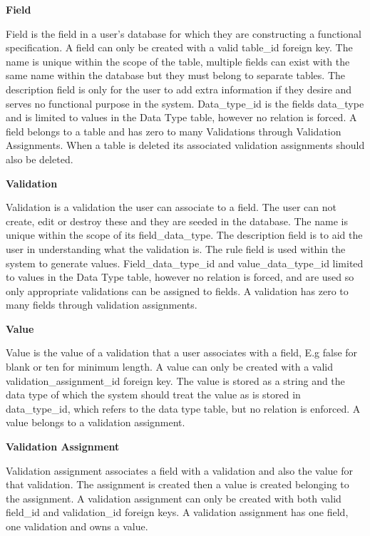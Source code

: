 \documentclass[a4paper,12pt]{article}
\begin{document}
\vspace{3mm}
\par \textbf{Field}
\par Field is the field in a user's database for which they are constructing a functional specification. A field can only be created with a valid table\_id foreign key. The name is unique within the scope of the table, multiple fields can exist with the same name within the database but they must belong to separate tables. The description field is only for the user to add extra information if they desire and serves no functional purpose in the system. Data\_type\_id is the fields data\_type and is limited to values in the Data Type table, however no relation is forced. A field belongs to a table and has zero to many Validations through Validation Assignments. When a table is deleted its associated validation assignments should also be deleted.
\vspace{3mm}
\par \textbf{Validation}
\par Validation is a validation the user can associate to a field. The user can not create, edit or destroy these and they are seeded in the database. The name is unique within the scope of its field\_data\_type. The description field is to aid the user in understanding what the validation is. The rule field is used within the system to generate values. Field\_data\_type\_id and value\_data\_type\_id limited to values in the Data Type table, however no relation is forced, and are used so only appropriate validations can be assigned to fields. A validation has zero to many fields through validation assignments.
\vspace{3mm}
\par \textbf{Value}
\par Value is the value of a validation that a user associates with a field, E.g false for blank or ten for minimum length. A value can only be created with a valid validation\_assignment\_id foreign key. The value is stored as a string and the data type of which the system should treat the value as is stored in data\_type\_id, which refers to the data type table, but no relation is enforced. A value belongs to a validation assignment.
\vspace{3mm}
\par \textbf{Validation Assignment}
\par Validation assignment associates a field with a validation and also the value for that validation. The assignment is created then a value is created belonging to the assignment. A validation assignment can only be created with both valid field\_id and validation\_id foreign keys. A validation assignment has one field, one validation and owns a value.
\end{document}

